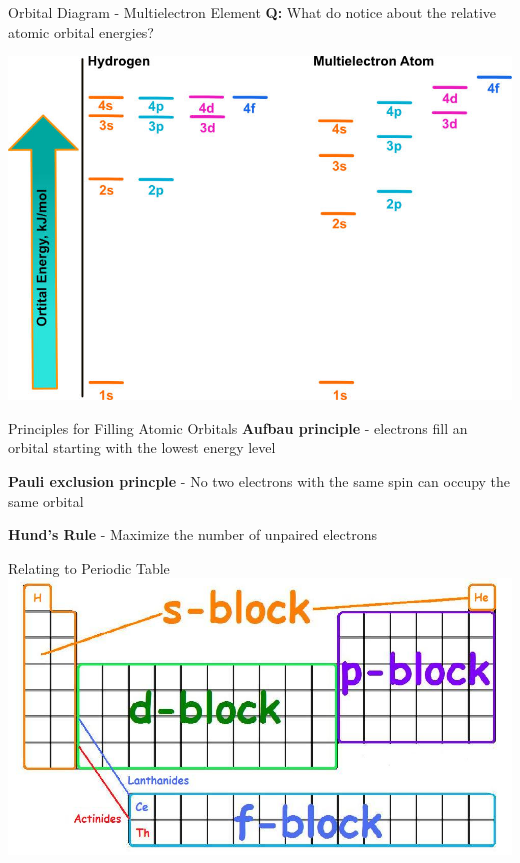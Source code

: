 \documentclass[11pt]{beamer}
\begin{document}
\begin{frame}{Orbital Diagram - Multielectron Element}
  \textbf{Q:} What do notice about the relative atomic orbital energies?
  
  \centering
  \includegraphics[scale=1.3]{orbital_energy}
\end{frame}

\begin{frame}{Principles for Filling Atomic Orbitals}
  \textbf{Aufbau principle} - electrons fill an orbital starting with
  the lowest energy level

  \textbf{Pauli exclusion princple} - No two electrons with the same
  spin can occupy the same orbital

  \textbf{Hund's Rule} - Maximize the number of unpaired electrons
\end{frame}

\begin{frame}{Relating to Periodic Table}
  \centering
  \includegraphics[width=\linewidth]{spdf_orbitals}
\end{frame}
\end{document}
